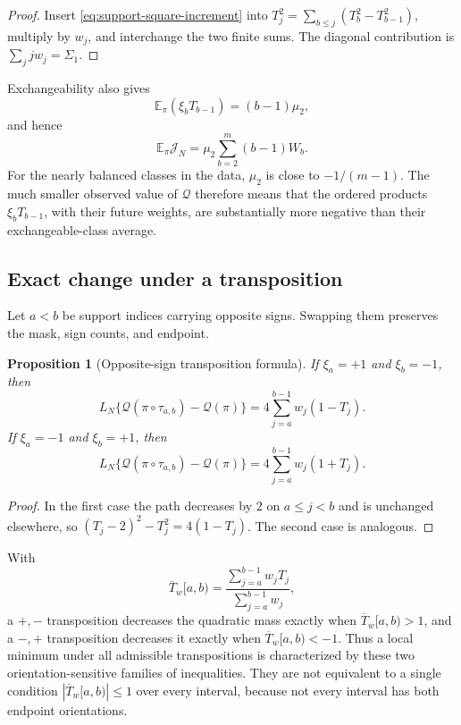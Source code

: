 \documentclass[11pt,reqno]{amsart}
\numberwithin{equation}{section}
\theoremstyle{plain}
\newtheorem{proposition}[theorem]{Proposition}
\theoremstyle{definition}
\theoremstyle{remark}
\newcommand{\E}{\mathbb E}
\newcommand{\QF}{\mathcal Q}
\begin{document}
\begin{proof}
Insert \eqref{eq:support-square-increment} into
\(T_j^2=\sum_{b\leq j}(T_b^2-T_{b-1}^2)\), multiply by \(w_j\), and interchange
the two finite sums.  The diagonal contribution is
\(\sum_jjw_j=\Sigma_1\).
\end{proof}

Exchangeability also gives
\begin{equation}
\E_{\pi}(\xi_bT_{b-1})=(b-1)\mu_2,
\label{eq:expected-restoration-step}
\end{equation}
and hence
\begin{equation}
\E_{\pi}\mathcal J_N
=\mu_2\sum_{b=2}^{m}(b-1)W_b.
\label{eq:expected-restoration-functional}
\end{equation}
For the nearly balanced classes in the data, \(\mu_2\) is close to
\(-1/(m-1)\).  The much smaller observed value of \(\QF\) therefore means
that the ordered products \(\xi_bT_{b-1}\), with their future weights, are
substantially more negative than their exchangeable-class average.

\subsection{Exact change under a transposition}
\label{subsec:transposition-calculus}

Let \(a<b\) be support indices carrying opposite signs.  Swapping them
preserves the mask, sign counts, and endpoint.

\begin{proposition}[Opposite-sign transposition formula]
\label{prop:transposition-formula}
If \(\xi_a=+1\) and \(\xi_b=-1\), then
\begin{equation}
L_N\{\QF(\pi\circ\tau_{a,b})-\QF(\pi)\}
=4\sum_{j=a}^{b-1}w_j(1-T_j).
\label{eq:plus-minus-transposition}
\end{equation}
If \(\xi_a=-1\) and \(\xi_b=+1\), then
\begin{equation}
L_N\{\QF(\pi\circ\tau_{a,b})-\QF(\pi)\}
=4\sum_{j=a}^{b-1}w_j(1+T_j).
\label{eq:minus-plus-transposition}
\end{equation}
\end{proposition}

\begin{proof}
In the first case the path decreases by \(2\) on \(a\leq j<b\) and is
unchanged elsewhere, so
\((T_j-2)^2-T_j^2=4(1-T_j)\).  The second case is analogous.
\end{proof}

With
\begin{equation}
\overline T_w[a,b)
=\frac{\sum_{j=a}^{b-1}w_jT_j}
{\sum_{j=a}^{b-1}w_j},
\label{eq:weighted-interval-mean}
\end{equation}
a \(+,-\) transposition decreases the quadratic mass exactly when
\(\overline T_w[a,b)>1\), and a \(-,+\) transposition decreases it exactly
when \(\overline T_w[a,b)<-1\).  Thus a local minimum under all admissible
transpositions is characterized by these two orientation-sensitive families
of inequalities.  They are not equivalent to a single condition
\(|\overline T_w[a,b)|\leq1\) over every interval, because not every interval
has both endpoint orientations.
\end{document}
